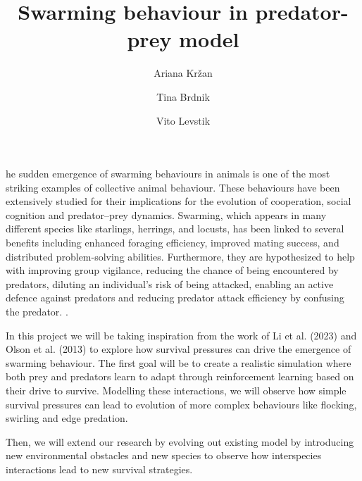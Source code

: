 \documentclass[9pt]{pnas-new}
\title{Swarming behaviour in predator-prey model}
\author{Ariana Kržan}
\author{Tina Brdnik}
\author{Vito Levstik}
\affil{Collective behaviour course research seminar report}
\begin{document}
\verticaladjustment{-2pt}

\maketitle
\thispagestyle{firststyle}

he sudden emergence of swarming behaviours in animals is one of the most striking examples of collective animal behaviour. 
These behaviours have been extensively studied for their implications for the evolution of cooperation, 
social cognition and predator–prey dynamics\cite{olson2013predator}. Swarming, which appears in many different species like starlings, 
herrings, and locusts, has been linked to several benefits including enhanced foraging efficiency, improved mating success, and distributed problem-solving abilities. 
Furthermore, they are hypothesized to help with improving group vigilance, reducing the chance of being encountered by predators, 
diluting an individual's risk of being attacked, enabling an active defence against predators and reducing predator attack efficiency by confusing the predator. \cite{li2023predator}.

In this project we will be taking inspiration from the work of Li et al. (2023) and Olson et al. (2013) to explore how survival pressures can drive the emergence of swarming behaviour. 
The first goal will be to create a realistic simulation where both prey and predators learn to adapt through reinforcement learning based on their drive to survive.
Modelling these interactions, we will observe how simple survival pressures can lead to evolution of more complex behaviours like flocking, swirling and edge predation. 

Then, we will extend our research by evolving out existing model by introducing new environmental obstacles and new species to observe how interspecies interactions lead to new survival strategies.
\end{document}
